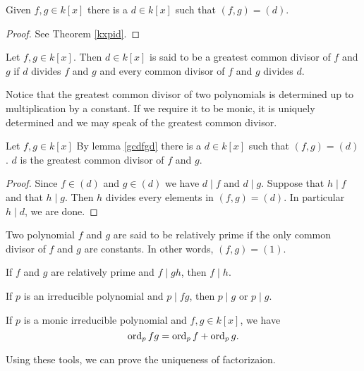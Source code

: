 \begin{lemma}\label{gcdfgd}
Given $f,g\in k[x]$ there is a $d\in k[x]$ such that $(f,g)=(d)$.
\end{lemma}
\begin{proof}
See Theorem \ref{kxpid}.
\end{proof}
\begin{definition}
Let $f,g\in k[x]$. Then $d\in k[x]$ is said to be a greatest common divisor of $f$ and $g$ if $d$ divides $f$ and $g$ and every common divisor of $f$ and $g$ divides $d$.
\end{definition}
\begin{remark}
Notice that the greatest common divisor of two polynomials is determined up to multiplication by a constant. If we require it to be monic, it is uniquely determined and we may speak of the greatest common divisor.
\end{remark}
\begin{lemma}
Let $f,g\in k[x]$ By lemma \ref{gcdfgd} there is a $d\in k[x]$ such that $(f,g)=(d)$. $d$ is the greatest common divisor of $f$ and $g$.
\end{lemma}
\begin{proof}
Since $f\in (d)$ and $g\in(d)$ we have $d\mid f$ and $d\mid g$. Suppose that $h\mid f$ and that $h\mid g$. Then $h$ divides every elements in $(f,g)=(d)$. In particular $h\mid d$, we are done.
\end{proof}
\begin{definition}
Two polynomial $f$ and $g$ are said to be relatively prime if the only common divisor of $f$ and $g$ are constants. In other words, $(f,g) = (1)$.
\end{definition}
\begin{proposition}
If $f$ and $g$ are relatively prime and $f\mid gh$, then $f\mid h$.
\end{proposition}
\begin{corollary}
If $p$ is an irreducible polynomial and $p\mid fg$, then $p\mid g$ or $p\mid g$. 
\end{corollary}
\begin{corollary}
If $p$ is a monic irreducible polynomial and $f,g\in k[x]$, we have $$\mbox{ord}_{p}\,fg=\mbox{ord}_{p}\,f+\mbox{ord}_{p}\,g.$$
\end{corollary}
Using these tools, we can prove the uniqueness of factorizaion.

